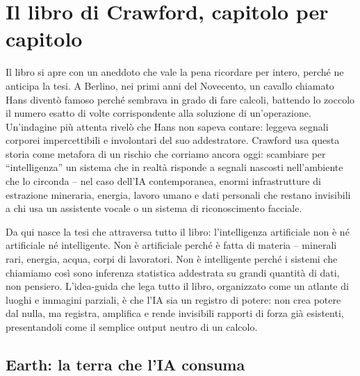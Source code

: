 \documentclass[a4paper,11pt]{article}
\begin{document}
\section{Il libro di Crawford, capitolo per capitolo}

Il libro si apre con un aneddoto che vale la pena ricordare per intero, perché ne anticipa la tesi. A Berlino, nei primi anni del Novecento, un cavallo chiamato Hans diventò famoso perché sembrava in grado di fare calcoli, battendo lo zoccolo il numero esatto di volte corrispondente alla soluzione di un'operazione. Un'indagine più attenta rivelò che Hans non sapeva contare: leggeva segnali corporei impercettibili e involontari del suo addestratore. Crawford usa questa storia come metafora di un rischio che corriamo ancora oggi: scambiare per ``intelligenza'' un sistema che in realtà risponde a segnali nascosti nell'ambiente che lo circonda -- nel caso dell'IA contemporanea, enormi infrastrutture di estrazione mineraria, energia, lavoro umano e dati personali che restano invisibili a chi usa un assistente vocale o un sistema di riconoscimento facciale.

Da qui nasce la tesi che attraversa tutto il libro: l'intelligenza artificiale non è né artificiale né intelligente. Non è artificiale perché è fatta di materia -- minerali rari, energia, acqua, corpi di lavoratori. Non è intelligente perché i sistemi che chiamiamo così sono inferenza statistica addestrata su grandi quantità di dati, non pensiero. L'idea-guida che lega tutto il libro, organizzato come un atlante di luoghi e immagini parziali, è che l'IA sia un registro di potere: non crea potere dal nulla, ma registra, amplifica e rende invisibili rapporti di forza già esistenti, presentandoli come il semplice output neutro di un calcolo.

\subsection{Earth: la terra che l'IA consuma}
\end{document}
